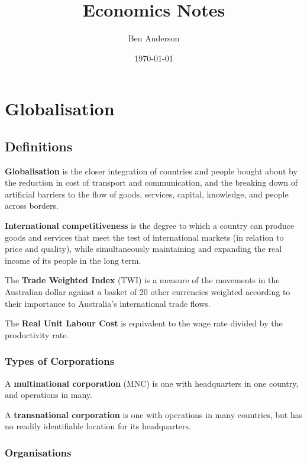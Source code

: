 \documentclass[a4paper,11pt]{report}
\begin{document}
\title{Economics Notes}
\author{Ben Anderson}
\date{\today}
\maketitle
\pagebreak

\tableofcontents
\pagebreak




\chapter{Globalisation}

\section{Definitions}

\textbf{Globalisation} is the closer integration of countries and people bought
about by the reduction in cost of transport and communication, and the breaking
down of artificial barriers to the flow of goods, services, capital, knowledge,
and people across borders.

\textbf{International competitiveness} is the degree to which a country can
produce goods and services that meet the test of international markets (in
relation to price and quality), while simultaneously maintaining and expanding
the real income of its people in the long term.

The \textbf{Trade Weighted Index} (TWI) is a measure of the movements in the
Australian dollar against a basket of 20 other currencies weighted according to
their importance to Australia's international trade flows.

The \textbf{Real Unit Labour Cost} is equivalent to the wage rate divided by the
productivity rate.

\subsection{Types of Corporations}

A \textbf{multinational corporation} (MNC) is one with headquarters in one
country, and operations in many.

A \textbf{transnational corporation} is one with operations in many countries,
but has no readily identifiable location for its headquarters.


\subsection{Organisations}
\end{document}
